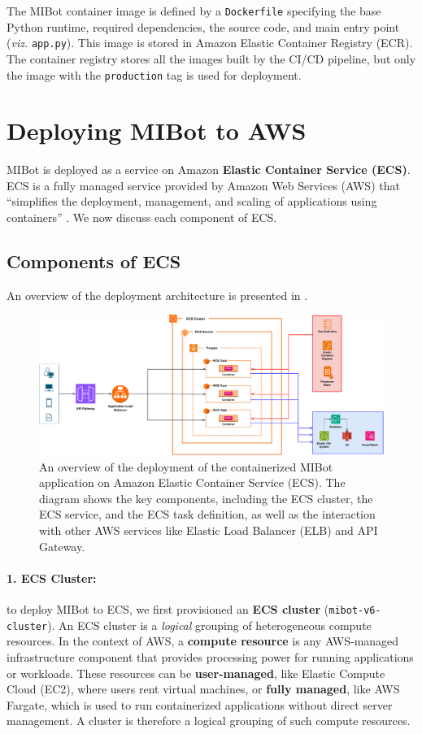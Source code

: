 The MIBot container image is defined by a \texttt{Dockerfile} specifying the base
Python runtime, required dependencies, the source code, and main entry point
(\emph{viz.} \texttt{app.py}). This image is stored in Amazon Elastic Container
Registry (ECR). The container registry stores all the images built by the CI/CD
pipeline, but only the image with the \texttt{production} tag is used for deployment.

\section{Deploying MIBot to AWS}
\label{sec:mibot-deployment}

MIBot is deployed as a service on Amazon \textbf{Elastic Container Service (ECS)}. ECS
is a fully managed service provided by Amazon Web Services (AWS) that ``simplifies the
deployment, management, and scaling of applications using containers''
\citep{aws-ecs-getting-started}. We now discuss each component of ECS.

\subsection{Components of ECS}
An overview of the deployment architecture is presented in .
\begin{figure}[ht]
	\centering
	\includegraphics[width=0.99\linewidth]{fig/deployment.drawio.pdf}
	\caption[MIBot Deployment on AWS ECS]{An overview of the deployment of the containerized MIBot application on Amazon Elastic Container Service (ECS). The diagram shows the key components, including the ECS cluster, the ECS service, and the ECS task definition, as well as the interaction with other AWS services like Elastic Load Balancer (ELB) and API Gateway.}
	\label{fig:ecs-components}
\end{figure}

\paragraph{1. ECS Cluster:} to deploy MIBot to ECS, we first provisioned an \textbf{ECS cluster}
(\texttt{mibot-v6-cluster}). An ECS cluster is a \textit{logical} grouping of
heterogeneous compute resources. In the context of AWS, a \textbf{compute resource} is
any AWS-managed infrastructure component that provides processing power for running
applications or workloads. These resources can be \textbf{user-managed}, like Elastic
Compute Cloud (EC2), where users rent virtual machines, or \textbf{fully managed}, like
AWS Fargate, which is used to run containerized applications without direct server
management. A cluster is therefore a logical grouping of such compute resources.

